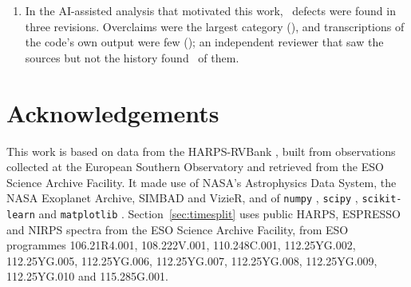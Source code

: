 \begin{enumerate}
      later published as planets, gathered at the top (\nmTsTreeTen\ of the ten ranked
      highest by the trees, against \nmTsExpTen\ expected), but the classifiers did not rank
      them better than the false-alarm probability alone, and \nmTsToiTopTen\ of those
      \nmTsTreeTen\ orbit stars with TESS candidates that observers were already following. Of
      two open signals tested with newer spectra under a rule written in advance, one was
      refuted and the other is undecided under the registered model (about
      $\nmTaHdSigma\sigma$ with a zero-point split chosen after the velocities were displayed).
\item In the AI-assisted analysis that motivated this work, \nmDefN\ defects were found
      in three revisions. Overclaims were the largest category (\nmDefCatOverclaim), and
      transcriptions of the code's own output were few (\nmDefOriCode); an independent
      reviewer that saw the sources but not the history found \nmDefRouteRev\ of them.
\end{enumerate}

\section*{Acknowledgements}

This work is based on data from the HARPS-RVBank \citep{Trifonov2020,Perdelwitz2024},
built from observations collected at the European Southern Observatory and
retrieved from the ESO Science Archive Facility. It made use of NASA's Astrophysics
Data System, the NASA Exoplanet Archive, SIMBAD and VizieR, and of \texttt{numpy}
\citep{Harris2020}, \texttt{scipy} \citep{Virtanen2020}, \texttt{scikit-learn}
\citep{Pedregosa2011} and \texttt{matplotlib} \citep{Hunter2007}. Section~\ref{sec:timesplit}
uses public HARPS, ESPRESSO and NIRPS spectra from the ESO Science Archive Facility,
from ESO programmes 106.21R4.001, 108.222V.001, 110.248C.001, 112.25YG.002,
112.25YG.005, 112.25YG.006, 112.25YG.007, 112.25YG.008, 112.25YG.009, 112.25YG.010 and
115.285G.001.


